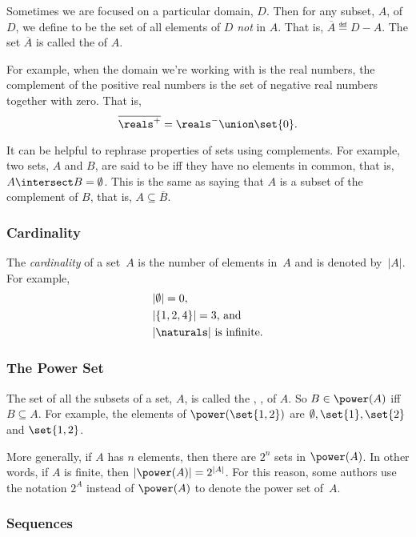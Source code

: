 Sometimes we are focused on a particular domain, $D$.  Then for any
subset, $A$, of $D$, we define  to be the set of all
elements of $D$ \textit{not} in $A$.  That is, $\overline{A} \eqdef D-A$.
The set $\overline{A}$ is called the  of $A$.

For example, when the domain we're working with is the real numbers,
the complement of the positive real numbers is the set of negative real
numbers together with zero.  That is,
\[
\overline{\reals^+} = \reals^- \union \set{0}.
\]

It can be helpful to rephrase properties of sets using complements.  For
example, two sets, $A$ and $B$, are said to be  iff they
have no elements in common, that is, $A \intersect B = \emptyset$.  This
is the same as saying that $A$ is a subset of the complement of $B$, that
is, $A \subseteq \overline{B}$.

\subsubsection{Cardinality}

The \emph{cardinality} of a set~$A$ is the number of elements in~$A$
and is denoted by~$|A|$.  For example,
\begin{align*}
    & |\emptyset| = 0, \\
    & |\{ 1, 2, 4 \}| = 3\text{, and} \\
    & |\naturals| \text{ is infinite.}
\end{align*}

\subsubsection{The Power Set}

The set of all the subsets of a set, $A$, is called the , , of $A$.  So $B \in \power(A)$ iff $B
\subseteq A$.  For example, the elements of $\power( \set{1, 2})$ are
$\emptyset, \set{1}, \set{2}$ and $\set{1, 2}$.

More generally, if $A$ has $n$ elements, then there are $2^n$ sets in
$\power(A)$.  In other words, if $A$ is finite, then $|\power(A)| =
  2^{|A|}$.  For this reason, some authors use the notation $2^A$
  instead of $\power(A)$ to denote the power set of~$A$.

\subsubsection{Sequences}


